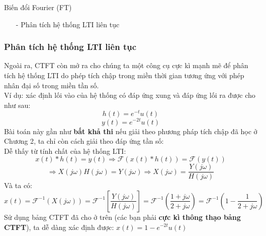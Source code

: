 \documentclass[8pt]{beamer}
\begin{document}
\begin{frame}{Biến đổi Fourier (FT)}
	\begin{itemize}
		\item[-] Phân tích hệ thống LTI liên tục
	\end{itemize}
\subsubsection{Phân tích hệ thống LTI liên tục}
Ngoài ra, CTFT còn mở ra cho chúng ta một công cụ cực kì mạnh mẽ để phân tích
hệ thống LTI do \alert{phép tích chập trong miền thời gian tương ứng với phép nhân đại số
trong miền tần số}.
\\Ví dụ: xác định \alert{lối vào} của hệ thống có đáp ứng xung và đáp ứng lối ra được cho như sau:
$$h(t)=e^{-t}u(t)$$
$$y(t)=e^{-2t}u(t)$$
Bài toán này gần như \textbf{bất khả thi} nếu giải theo phương pháp tích chập đã học ở \alert{Chương 2}, ta chỉ còn cách giải theo đáp ứng tần số:
\\ Dễ thấy từ tính chất của hệ thống LTI:
$$x(t)*h(t)=y(t)\Rightarrow \mathscr{F}(x(t)*h(t))=\mathscr{F}(y(t))$$
$$\Rightarrow X(j\omega)H(j\omega)=Y(j\omega)\Rightarrow X(j\omega)=\frac{Y(j\omega)}{H(j\omega)}$$
Và ta có: $$x(t)=\mathscr{F}^{-1}(X(j\omega))=\mathscr{F}^{-1}\left[\frac{Y(j\omega)}{H(j\omega)}\right]=\mathscr{F}^{-1}\left(\frac{1+j\omega}{2+j\omega}\right)=\mathscr{F}^{-1}\left(1-\frac{1}{2+j\omega}\right)$$
Sử dụng bảng CTFT đã cho ở trên (các bạn phải \textbf{cực kì thông thạo bảng CTFT}), ta dễ dàng xác định được: $x(t)=1-e^{-2t}u(t)$
\end{frame}
\end{document}
